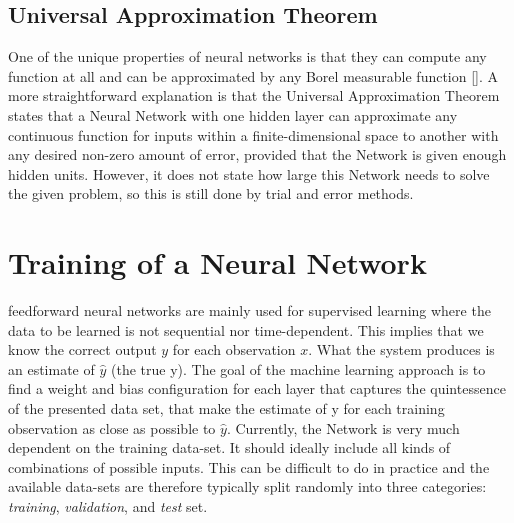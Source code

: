 \subsection{Universal Approximation Theorem}
One of the unique properties of neural networks is that they can compute any function at all and can be approximated by any Borel measurable function [\cite{hornik1991approximation}]. A more straightforward explanation is that the Universal Approximation Theorem states that a Neural Network with one hidden layer can approximate any continuous function for inputs within a finite-dimensional space to another with any desired non-zero amount of error, provided that the Network is given enough hidden units. However, it does not state how large this Network needs to solve the given problem, so this is still done by trial and error methods.



\section{Training of a Neural Network}
feedforward neural networks are mainly used for supervised learning where the data to be learned is not sequential nor time-dependent. This implies that we know the correct output $y$ for each observation $x$. What the system produces is an estimate of $\hat{y}$ (the true y).
The goal of the machine learning approach is to find a weight and bias configuration for each layer that captures the quintessence of the presented data set, that make the estimate of y for each training
observation as close as possible to $\hat{y}$.
Currently, the Network is very much dependent on the training data-set. It should ideally include all kinds of combinations of possible inputs. This can be difficult to do in practice and the available data-sets are therefore typically split randomly into three
categories: \emph{training}, \emph{validation}, and \emph{test} set.\\

